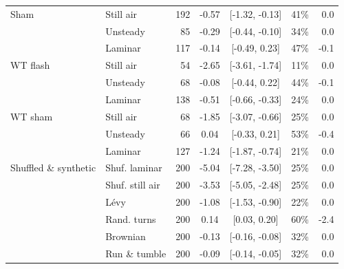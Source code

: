 \begin{table}[ht]
\begin{tabular}{llrccrr}
\hline
Sham & Still air & 192 & -0.57 & [-1.32, -0.13] & 41\% & 0.0 \\
 & Unsteady & 85 & -0.29 & [-0.44, -0.10] & 34\% & 0.0 \\
 & Laminar & 117 & -0.14 & [-0.49, 0.23] & 47\% & -0.1 \\
\hline
WT flash & Still air & 54 & -2.65 & [-3.61, -1.74] & 11\% & 0.0 \\
 & Unsteady & 68 & -0.08 & [-0.44, 0.22] & 44\% & -0.1 \\
 & Laminar & 138 & -0.51 & [-0.66, -0.33] & 24\% & 0.0 \\
\hline
WT sham & Still air & 68 & -1.85 & [-3.07, -0.66] & 25\% & 0.0 \\
 & Unsteady & 66 & 0.04 & [-0.33, 0.21] & 53\% & -0.4 \\
 & Laminar & 127 & -1.24 & [-1.87, -0.74] & 21\% & 0.0 \\
\hline
Shuffled \& synthetic & Shuf. laminar & 200 & -5.04 & [-7.28, -3.50] & 25\% & 0.0 \\
 & Shuf. still air & 200 & -3.53 & [-5.05, -2.48] & 25\% & 0.0 \\
 & L\'evy & 200 & -1.08 & [-1.53, -0.90] & 22\% & 0.0 \\
 & Rand. turns & 200 & 0.14 & [0.03, 0.20] & 60\% & -2.4 \\
 & Brownian & 200 & -0.13 & [-0.16, -0.08] & 32\% & 0.0 \\
 & Run \& tumble & 200 & -0.09 & [-0.14, -0.05] & 32\% & 0.0 \\
\hline
\end{tabular}
\end{table}
